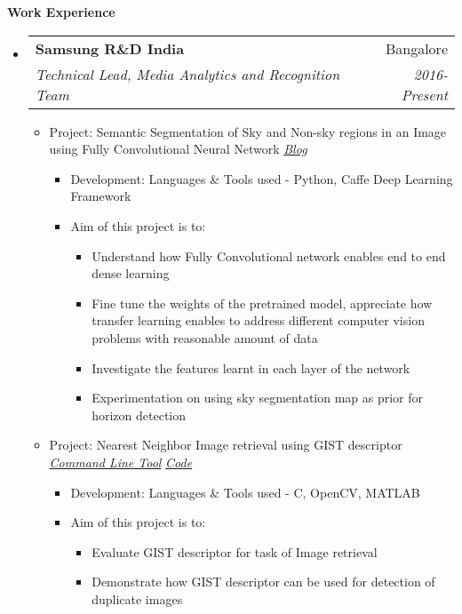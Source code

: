 \documentclass[letterpaper,11pt]{article}
\makeatletter
\def\CC{{C\nolinebreak[4]\hspace{-.05em}\raisebox{.4ex}{\tiny\bf ++}}}
\newcommand{\resitem}[1]{\item #1 \vspace{-2pt}}
\newcommand{\resheading}[1]{{\large \colorbox{mygrey}{\begin{minipage}{\textwidth}{\textbf{#1 \vphantom{p\^{E}}}}\end{minipage}}}}
\newcommand{\ressubheading}[4]{
	\begin{tabular*}{7.0in}{l@{\extracolsep{\fill}}r}
		\textbf{#1} & #2 \\
		\textit{#3} & \textit{#4} \\
	\end{tabular*}\vspace{-6pt}}
\makeatother
\begin{document}
\resheading{Work Experience}
\begin{itemize}
	\item
		\ressubheading{Samsung R\&D India}{Bangalore}{Technical Lead, Media Analytics and Recognition Team}{2016-Present}
		\vspace{1mm}
		\begin{itemize}
				\resitem[]{\faCircleO
					\hspace{1mm}Project: Semantic Segmentation of Sky and Non-sky regions in an Image using Fully Convolutional Neural Network
					\faGlobe \hspace{1mm} \href{https://nrupatunga.github.io/}{\emph{Blog}}}
				\begin{itemize}
						\resitem{Development: Languages \& Tools used - Python, Caffe Deep Learning Framework}
				\end{itemize}
				\begin{itemize}
						\resitem{Aim of this project is to:}
						\begin{itemize}
								\resitem{Understand how Fully Convolutional network enables end to end dense learning}
								\resitem{Fine tune the weights of the pretrained model, appreciate how transfer learning enables 
									to address different computer vision problems with reasonable amount of data}
								\resitem{Investigate the features learnt in each layer of the network}
								\resitem{Experimentation on using sky segmentation map as prior for horizon detection}
						\end{itemize}
				\end{itemize}
				\vspace{1mm}
				\resitem[]{\faCircleO \hspace{1mm}Project: Nearest Neighbor Image retrieval using GIST descriptor
					\faWrench \hspace{1mm} \href{https://github.com/nrupatunga/GIST-global-Image-Descripor}{\emph{Command Line Tool}}
					\faGithub \hspace{1mm} \href{https://github.com/nrupatunga/GIST-global-Image-Descripor}{\emph{Code}}}
				\begin{itemize}
						\resitem{Development: Languages \& Tools used - \CC, OpenCV, MATLAB}
				\end{itemize}
				\begin{itemize}
						\resitem{Aim of this project is to:}
						\begin{itemize}
								\resitem{Evaluate GIST descriptor for task of Image retrieval}
								\resitem{Demonstrate how GIST descriptor can be used for detection of duplicate images}

\end{itemize}
\end{itemize}
\end{itemize}
\end{itemize}
\end{document}
